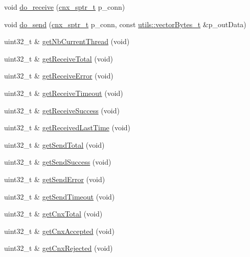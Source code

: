 \begin{DoxyCompactItemize}
\item 
void \hyperlink{classxtd_1_1network_1_1base_1_1Server_a5852cbdc5fa348c25797962a69d6b115}{do\+\_\+receive} (\hyperlink{classxtd_1_1network_1_1base_1_1Server_aea8c26b2edf1f6c8802db01b3c6b6036}{cnx\+\_\+sptr\+\_\+t} p\+\_\+conn)
\item 
void \hyperlink{classxtd_1_1network_1_1base_1_1Server_aa633c11edb82dcfc0b3804f4d57cdc5c}{do\+\_\+send} (\hyperlink{classxtd_1_1network_1_1base_1_1Server_aea8c26b2edf1f6c8802db01b3c6b6036}{cnx\+\_\+sptr\+\_\+t} p\+\_\+conn, const \hyperlink{namespacextd_1_1network_1_1utils_a9fedf0d18549b8034e9ae347955e9a9a}{utils\+::vector\+Bytes\+\_\+t} \&p\+\_\+out\+Data)
\item 
uint32\+\_\+t \& \hyperlink{classxtd_1_1network_1_1base_1_1Server_afdbfe06eac7640eed92c86ea38c089d2}{get\+Nb\+Current\+Thread} (void)
\item 
uint32\+\_\+t \& \hyperlink{classxtd_1_1network_1_1base_1_1Server_a2f1c82fa4d94a0868ab1a9b957b0e1ed}{get\+Receive\+Total} (void)
\item 
uint32\+\_\+t \& \hyperlink{classxtd_1_1network_1_1base_1_1Server_a798d800b0cda41fb3d6bc9be0cb07036}{get\+Receive\+Error} (void)
\item 
uint32\+\_\+t \& \hyperlink{classxtd_1_1network_1_1base_1_1Server_a897bb823741706c6f3f91aef601ab3d9}{get\+Receive\+Timeout} (void)
\item 
uint32\+\_\+t \& \hyperlink{classxtd_1_1network_1_1base_1_1Server_ae2e9b2858e9a7f142f98fcc4299b2a4a}{get\+Receive\+Success} (void)
\item 
uint32\+\_\+t \& \hyperlink{classxtd_1_1network_1_1base_1_1Server_a48e49f13ebcc958cb05737af08c761fc}{get\+Received\+Last\+Time} (void)
\item 
uint32\+\_\+t \& \hyperlink{classxtd_1_1network_1_1base_1_1Server_a4b5d9bb1401c63af63598ab987dc1ea1}{get\+Send\+Total} (void)
\item 
uint32\+\_\+t \& \hyperlink{classxtd_1_1network_1_1base_1_1Server_ad225f1e73ec0fc1ba2a54e3363881aa4}{get\+Send\+Success} (void)
\item 
uint32\+\_\+t \& \hyperlink{classxtd_1_1network_1_1base_1_1Server_adeb8afa131ea136a61297f6d6e7af96a}{get\+Send\+Error} (void)
\item 
uint32\+\_\+t \& \hyperlink{classxtd_1_1network_1_1base_1_1Server_af7fb5d4acd247d070d7330686d2d0717}{get\+Send\+Timeout} (void)
\item 
uint32\+\_\+t \& \hyperlink{classxtd_1_1network_1_1base_1_1Server_aaed2e2436b27ebb7609c66e1002a8c56}{get\+Cnx\+Total} (void)
\item 
uint32\+\_\+t \& \hyperlink{classxtd_1_1network_1_1base_1_1Server_a3025e5dd8f30f36ebe52568d5c45966b}{get\+Cnx\+Accepted} (void)
\item 
uint32\+\_\+t \& \hyperlink{classxtd_1_1network_1_1base_1_1Server_a07a3891c57d59f642d491e1d30e3eaa1}{get\+Cnx\+Rejected} (void)
\end{DoxyCompactItemize}
